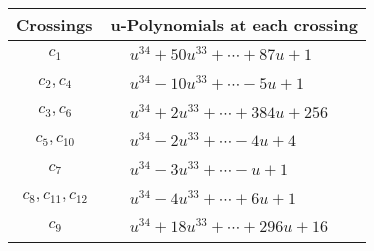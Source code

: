 \documentclass[1p]{elsarticle_modified}
\theoremstyle{definition}
\begin{document}
\begin{tabular}{m{50pt}|m{274pt}}
Crossings & \hspace{64pt}u-Polynomials at each crossing \\
\hline $$\begin{aligned}c_{1}\end{aligned}$$&$\begin{aligned}
&u^{34}+50 u^{33}+\cdots+87 u+1
\end{aligned}$\\
\hline $$\begin{aligned}c_{2},c_{4}\end{aligned}$$&$\begin{aligned}
&u^{34}-10 u^{33}+\cdots-5 u+1
\end{aligned}$\\
\hline $$\begin{aligned}c_{3},c_{6}\end{aligned}$$&$\begin{aligned}
&u^{34}+2 u^{33}+\cdots+384 u+256
\end{aligned}$\\
\hline $$\begin{aligned}c_{5},c_{10}\end{aligned}$$&$\begin{aligned}
&u^{34}-2 u^{33}+\cdots-4 u+4
\end{aligned}$\\
\hline $$\begin{aligned}c_{7}\end{aligned}$$&$\begin{aligned}
&u^{34}-3 u^{33}+\cdots- u+1
\end{aligned}$\\
\hline $$\begin{aligned}c_{8},c_{11},c_{12}\end{aligned}$$&$\begin{aligned}
&u^{34}-4 u^{33}+\cdots+6 u+1
\end{aligned}$\\
\hline $$\begin{aligned}c_{9}\end{aligned}$$&$\begin{aligned}
&u^{34}+18 u^{33}+\cdots+296 u+16
\end{aligned}$\\
\hline
\end{tabular}\\~\\
\newpage\renewcommand{\arraystretch}{1}
\end{document}

